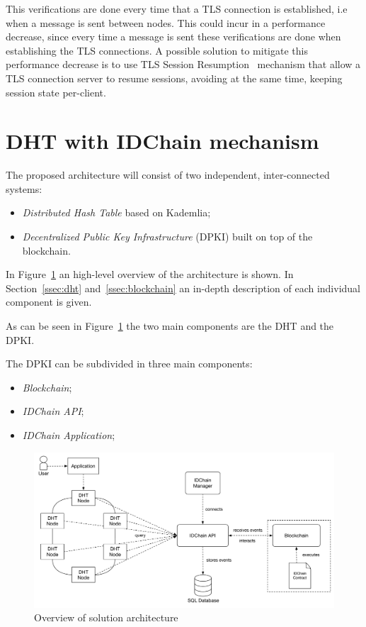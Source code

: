 This verifications are done every time that a TLS connection is established, i.e when a message is sent between nodes.
This could incur in a performance decrease, since every time a message is sent these verifications are done when establishing the TLS connections.
A possible solution to mitigate this performance decrease is to use TLS Session Resumption~\cite{rfc5077} mechanism that allow a TLS connection server to resume sessions, avoiding at the same time, keeping session state per-client.

\section{DHT with IDChain mechanism}\label{architecture:idchain-overview}

The proposed architecture will consist of two independent, inter-connected systems:

\begin{itemize}
  \item \textit{Distributed Hash Table} based on Kademlia;
  \item \textit{Decentralized Public Key Infrastructure} (DPKI) built on top of the blockchain.
\end{itemize}


In Figure~\ref{fig:architecture-overview} an high-level overview of the architecture is shown.
In Section~\ref{ssec:dht} and~\ref{ssec:blockchain} an in-depth description of each individual component is given.

As can be seen in Figure~\ref{fig:architecture-overview} the two main components are the \ac{DHT} and the \ac{DPKI}.

The DPKI can be subdivided in three main components:
\begin{itemize}
	\item \textit{Blockchain};
  \item \textit{IDChain API};
  \item \textit{IDChain Application};
\end{itemize}

\begin{figure}[htb]
  \includegraphics[width=\linewidth]{Figures/architecture-overview.pdf}
  \caption{Overview of solution architecture}
\label{fig:architecture-overview}
\end{figure}

